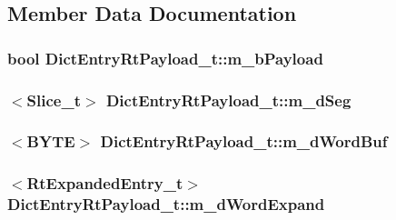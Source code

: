 \subsection{Member Data Documentation}
\hypertarget{structDictEntryRtPayload__t_a5c5cfcc8403b3da3b1e36b42935c3d58}{
\subsubsection[{m\-\_\-b\-Payload}]{\setlength{\rightskip}{0pt plus 5cm}bool Dict\-Entry\-Rt\-Payload\-\_\-t\-::m\-\_\-b\-Payload}}\label{structDictEntryRtPayload__t_a5c5cfcc8403b3da3b1e36b42935c3d58}
\hypertarget{structDictEntryRtPayload__t_a1ec2d456b0d57c305f987e17856c067a}{
\subsubsection[{m\-\_\-d\-Seg}]{$<${\bf Slice\-\_\-t}$>$ Dict\-Entry\-Rt\-Payload\-\_\-t\-::m\-\_\-d\-Seg}}\label{structDictEntryRtPayload__t_a1ec2d456b0d57c305f987e17856c067a}
\hypertarget{structDictEntryRtPayload__t_a232ddc44e203eec3f66122b69c4bceb0}{
\subsubsection[{m\-\_\-d\-Word\-Buf}]{$<${\bf B\-Y\-T\-E}$>$ Dict\-Entry\-Rt\-Payload\-\_\-t\-::m\-\_\-d\-Word\-Buf}}\label{structDictEntryRtPayload__t_a232ddc44e203eec3f66122b69c4bceb0}
\hypertarget{structDictEntryRtPayload__t_a450df29225c83a8857cd48d485351c9d}{
\subsubsection[{m\-\_\-d\-Word\-Expand}]{$<${\bf Rt\-Expanded\-Entry\-\_\-t}$>$ Dict\-Entry\-Rt\-Payload\-\_\-t\-::m\-\_\-d\-Word\-Expand}}\label{structDictEntryRtPayload__t_a450df29225c83a8857cd48d485351c9d}
